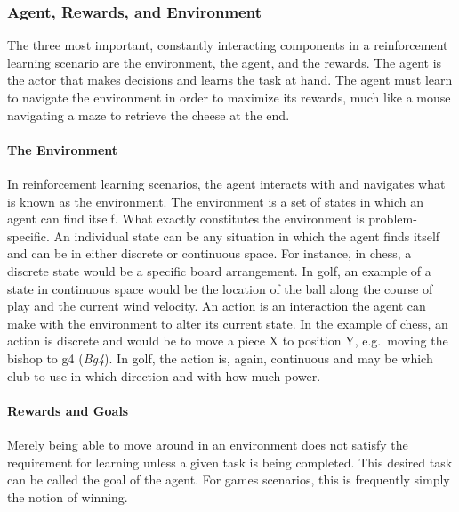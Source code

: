 \subsubsection*{Agent, Rewards, and Environment}


The three most important, constantly interacting components in a reinforcement
learning scenario are
the environment, the agent, and the rewards.
%
The agent is the actor that makes decisions and learns the task at hand.
%
The agent must learn to navigate the environment in order to maximize its
rewards,
much like a mouse navigating a maze to retrieve the cheese at the end.

\paragraph*{The Environment}

In reinforcement learning scenarios,
the agent interacts with and navigates what is known as the environment.
%
The environment is a set of states in which an agent can find itself.
%
What exactly constitutes the environment is problem-specific.
%
An individual state can be any situation in which the agent finds itself
and can be in either discrete or continuous space.
%
For instance, in chess, a discrete state would be a specific board arrangement.
%
In golf, an example of a state in continuous space would be 
the location of the ball along the course of play
and the current wind velocity.
%
An action is an interaction the agent can make with the environment to alter
its current state.
%
In the example of chess,
an action is discrete and would be to move a piece X to position Y,
e.g.\  moving the bishop to g4 (\textit{Bg4}).
%
In golf, the action is, again, continuous and may be
which club to use in which direction and with how much power.

\paragraph*{Rewards and Goals}

Merely being able to move around in an environment does not satisfy the
requirement for learning unless a given task is being completed.
%
This desired task can be called the goal of the agent.
%
For games scenarios,
this is frequently simply the notion of winning.

